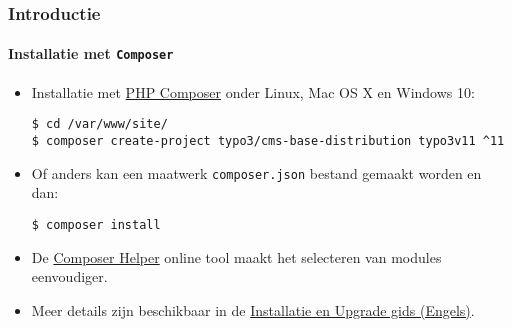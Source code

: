 %

\begin{frame}[fragile]
	\frametitle{Introductie}
	\framesubtitle{Installatie met \texttt{Composer}}


	\begin{itemize}
		\item Installatie met \href{https://getcomposer.org}{PHP Composer} onder Linux, Mac OS X en Windows 10:
\begin{lstlisting}
$ cd /var/www/site/
$ composer create-project typo3/cms-base-distribution typo3v11 ^11
\end{lstlisting}

		\item Of anders kan een maatwerk \texttt{composer.json} bestand gemaakt worden en dan:
\begin{lstlisting}
$ composer install
\end{lstlisting}

		\item De \href{https://get.typo3.org/misc/composer/helper}{Composer Helper}
			online tool maakt het selecteren van modules eenvoudiger.

		\item Meer details zijn beschikbaar in de
			\href{https://docs.typo3.org/m/typo3/guide-installation/master/en-us/}{Installatie en Upgrade gids (Engels)}.

	\end{itemize}
\end{frame}

